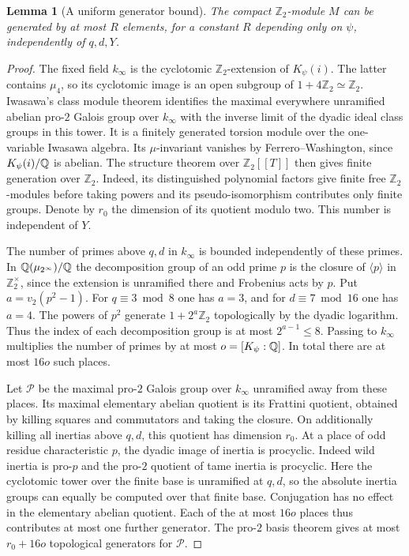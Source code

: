 \documentclass[a4paper,11pt]{article}
\newtheorem{lemma}[proposition]{Lemma}
\theoremstyle{definition}
\theoremstyle{remark}
\newcommand{\ZZ}{\mathbb Z}\newcommand{\ord}{\operatorname{ord}}
\numberwithin{equation}{section}
\begin{document}
\begin{lemma}[A uniform generator bound]\label{lem:generators15}
The compact \(\ZZ_2\)-module \(M\) can be generated by at most \(R\) elements, for a constant \(R\) depending only on \(\psi\), independently of \(q,d,Y\).
\end{lemma}
\begin{proof}
The fixed field \(k_\infty\) is the cyclotomic \(\ZZ_2\)-extension of \(K_\psi(i)\). The latter contains \(\mu_4\), so its cyclotomic image is an open subgroup of \(1+4\ZZ_2\simeq\ZZ_2\). Iwasawa's class module theorem identifies the maximal everywhere unramified abelian pro-\(2\) Galois group over \(k_\infty\) with the inverse limit of the dyadic ideal class groups in this tower. It is a finitely generated torsion module over the one-variable Iwasawa algebra. Its \(\mu\)-invariant vanishes by Ferrero--Washington, since \(K_\psi(i)/\mathbb Q\) is abelian. The structure theorem over \(\ZZ_2[[T]]\) then gives finite generation over \(\ZZ_2\). Indeed, its distinguished polynomial factors give finite free \(\ZZ_2\)-modules before taking powers and its pseudo-isomorphism contributes only finite groups. Denote by \(r_0\) the dimension of its quotient modulo two. This number is independent of \(Y\).~\cite{II-II-II-iwasawa15,II-II-II-fw13}

The number of primes above \(q,d\) in \(k_\infty\) is bounded independently of these primes. In \(\mathbb Q(\mu_{2^\infty})/\mathbb Q\) the decomposition group of an odd prime \(p\) is the closure of \(\langle p\rangle\) in \(\ZZ_2^\times\), since the extension is unramified there and Frobenius acts by \(p\). Put \(a=v_2(p^2-1)\). For \(q\equiv3\bmod8\) one has \(a=3\), and for \(d\equiv7\bmod16\) one has \(a=4\). The powers of \(p^2\) generate \(1+2^a\ZZ_2\) topologically by the dyadic logarithm. Thus the index of each decomposition group is at most \(2^{a-1}\le8\). Passing to \(k_\infty\) multiplies the number of primes by at most \(o=[K_\psi:\mathbb Q]\). In total there are at most \(16o\) such places.

Let \(\mathcal P\) be the maximal pro-\(2\) Galois group over \(k_\infty\) unramified away from these places. Its maximal elementary abelian quotient is its Frattini quotient, obtained by killing squares and commutators and taking the closure. On additionally killing all inertias above \(q,d\), this quotient has dimension \(r_0\). At a place of odd residue characteristic \(p\), the dyadic image of inertia is procyclic. Indeed wild inertia is pro-\(p\) and the pro-\(2\) quotient of tame inertia is procyclic. Here the cyclotomic tower over the finite base is unramified at \(q,d\), so the absolute inertia groups can equally be computed over that finite base. Conjugation has no effect in the elementary abelian quotient. Each of the at most \(16o\) places thus contributes at most one further generator. The pro-\(2\) basis theorem gives at most \(r_0+16o\) topological generators for \(\mathcal P\).


\end{proof}
\end{document}
